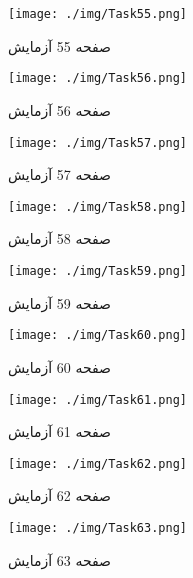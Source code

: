 {    %
    \begin{figure}[htpb]
        \centering
        \texttt{[image: ./img/Task55.png]}
        \caption{ صفحه 55 آزمایش }
        \label{fig:Task55}
    \end{figure}


    \begin{figure}[htpb]
        \centering
        \texttt{[image: ./img/Task56.png]}
        \caption{ صفحه 56 آزمایش }
        \label{fig:Task56}
    \end{figure}


    \begin{figure}[htpb]
        \centering
        \texttt{[image: ./img/Task57.png]}
        \caption{ صفحه 57 آزمایش }
        \label{fig:Task57}
    \end{figure}


    \begin{figure}[htpb]
        \centering
        \texttt{[image: ./img/Task58.png]}
        \caption{ صفحه 58 آزمایش }
        \label{fig:Task58}
    \end{figure}


    \begin{figure}[htpb]
        \centering
        \texttt{[image: ./img/Task59.png]}
        \caption{ صفحه 59 آزمایش }
        \label{fig:Task59}
    \end{figure}


    \begin{figure}[htpb]
        \centering
        \texttt{[image: ./img/Task60.png]}
        \caption{ صفحه 60 آزمایش }
        \label{fig:Task60}
    \end{figure}


    \begin{figure}[htpb]
        \centering
        \texttt{[image: ./img/Task61.png]}
        \caption{ صفحه 61 آزمایش }
        \label{fig:Task61}
    \end{figure}


    \begin{figure}[htpb]
        \centering
        \texttt{[image: ./img/Task62.png]}
        \caption{ صفحه 62 آزمایش }
        \label{fig:Task62}
    \end{figure}


    \begin{figure}[htpb]
        \centering
        \texttt{[image: ./img/Task63.png]}
        \caption{ صفحه 63 آزمایش }
        \label{fig:Task63}
    \end{figure}


}
